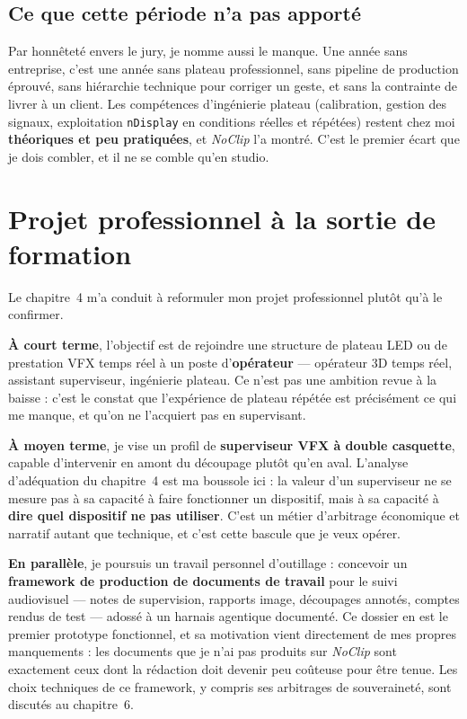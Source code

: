\documentclass[11pt,a4paper]{report}
\begin{document}
\subsection{Ce que cette période n'a pas apporté}
Par honnêteté envers le jury, je nomme aussi le manque. Une année sans entreprise, c'est une
année sans plateau professionnel, sans pipeline de production éprouvé, sans hiérarchie
technique pour corriger un geste, et sans la contrainte de livrer à un client. Les compétences
d'ingénierie plateau (calibration, gestion des signaux, exploitation \texttt{nDisplay} en
conditions réelles et répétées) restent chez moi \textbf{théoriques et peu pratiquées}, et
\textit{NoClip} l'a montré. C'est le premier écart que je dois combler, et il ne se comble
qu'en studio.

\section{Projet professionnel à la sortie de formation}
Le chapitre~4 m'a conduit à reformuler mon projet professionnel plutôt qu'à le confirmer.

\textbf{À court terme}, l'objectif est de rejoindre une structure de plateau LED ou de prestation
VFX temps réel à un poste d'\textbf{opérateur} --- opérateur 3D temps réel, assistant superviseur,
ingénierie plateau. Ce n'est pas une ambition revue à la baisse : c'est le constat que l'expérience
de plateau répétée est précisément ce qui me manque, et qu'on ne l'acquiert pas en supervisant.

\textbf{À moyen terme}, je vise un profil de \textbf{superviseur VFX à double casquette}, capable
d'intervenir en amont du découpage plutôt qu'en aval. L'analyse d'adéquation du chapitre~4 est
ma boussole ici : la valeur d'un superviseur ne se mesure pas à sa capacité à faire fonctionner
un dispositif, mais à sa capacité à \textbf{dire quel dispositif ne pas utiliser}. C'est un métier
d'arbitrage économique et narratif autant que technique, et c'est cette bascule que je veux
opérer.

\textbf{En parallèle}, je poursuis un travail personnel d'outillage : concevoir un \textbf{framework
de production de documents de travail} pour le suivi audiovisuel --- notes de supervision,
rapports image, découpages annotés, comptes rendus de test --- adossé à un harnais agentique
documenté. Ce dossier en est le premier prototype fonctionnel, et sa motivation vient
directement de mes propres manquements : les documents que je n'ai pas produits sur
\textit{NoClip} sont exactement ceux dont la rédaction doit devenir peu coûteuse pour être
tenue. Les choix techniques de ce framework, y compris ses arbitrages de souveraineté, sont
discutés au chapitre~6.
\end{document}
